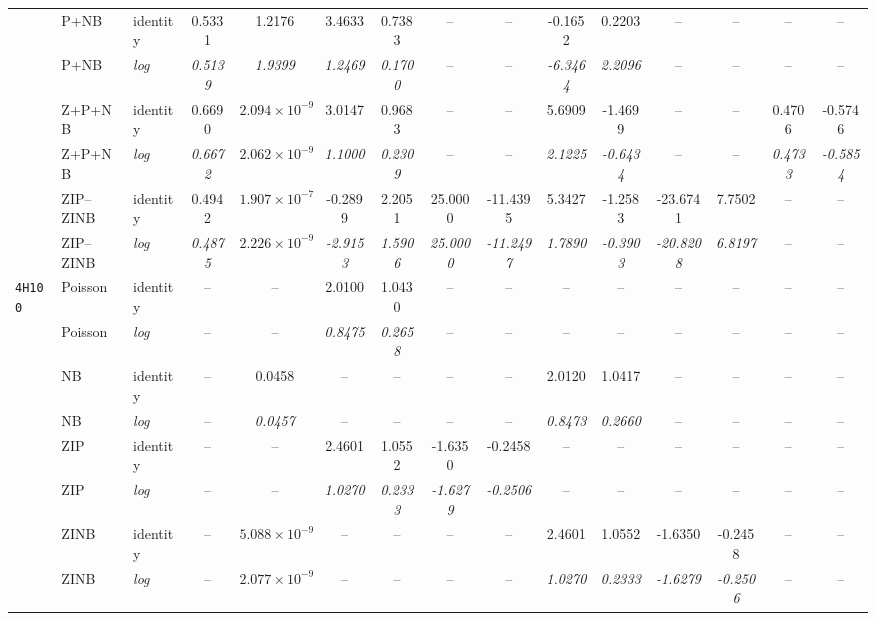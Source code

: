 \begin{table}
{\begin{tabular}{l l l c c c c c c c c c c c c}
 & P+NB & identity & 0.5331 & 1.2176 & 3.4633 & 0.7383 & -- & -- & -0.1652 & 0.2203 & -- & -- & -- & -- \\
 & P+NB & \textit{log} & \textit{0.5139} & \textit{1.9399} & \textit{1.2469} & \textit{0.1700} & -- & -- & \textit{-6.3464} & \textit{2.2096} & -- & -- & -- & -- \\

 & Z+P+NB & identity & 0.6690 & $2.094\times10^{-9}$ & 3.0147 & 0.9683 & -- & -- & 5.6909 & -1.4699 & -- & -- & 0.4706 & -0.5746 \\
 & Z+P+NB & \textit{log} & \textit{0.6672} & $\mathit{2.062\times10^{-9}}$ & \textit{1.1000} & \textit{0.2309} & -- & -- & \textit{2.1225} & \textit{-0.6434} & -- & -- & \textit{0.4733} & \textit{-0.5854} \\

 & ZIP--ZINB & identity & 0.4942 & $1.907\times10^{-7}$ & -0.2899 & 2.2051 & 25.0000 & -11.4395 & 5.3427 & -1.2583 & -23.6741 & 7.7502 & -- & -- \\
 & ZIP--ZINB & \textit{log} & \textit{0.4875} & $\mathit{2.226\times10^{-9}}$ & \textit{-2.9153} & \textit{1.5906} & \textit{25.0000} & \textit{-11.2497} & \textit{1.7890} & \textit{-0.3903} & \textit{-20.8208} & \textit{6.8197} & -- & -- \\

\midrule

\multirow{14}{*}{\texttt{4H100}} & Poisson & identity & -- & -- & 2.0100 & 1.0430 & -- & -- & -- & -- & -- & -- & -- & -- \\
 & Poisson & \textit{log} & -- & -- & \textit{0.8475} & \textit{0.2658} & -- & -- & -- & -- & -- & -- & -- & -- \\

 & NB & identity & -- & 0.0458 & -- & -- & -- & -- & 2.0120 & 1.0417 & -- & -- & -- & -- \\
 & NB & \textit{log} & -- & \textit{0.0457} & -- & -- & -- & -- & \textit{0.8473} & \textit{0.2660} & -- & -- & -- & -- \\

 & ZIP & identity & -- & -- & 2.4601 & 1.0552 & -1.6350 & -0.2458 & -- & -- & -- & -- & -- & -- \\
 & ZIP & \textit{log} & -- & -- & \textit{1.0270} & \textit{0.2333} & \textit{-1.6279} & \textit{-0.2506} & -- & -- & -- & -- & -- & -- \\

 & ZINB & identity & -- & $5.088\times10^{-9}$ & -- & -- & -- & -- & 2.4601 & 1.0552 & -1.6350 & -0.2458 & -- & -- \\
 & ZINB & \textit{log} & -- & $\mathit{2.077\times10^{-9}}$ & -- & -- & -- & -- & \textit{1.0270} & \textit{0.2333} & \textit{-1.6279} & \textit{-0.2506} & -- & -- \\


\end{tabular}}
\end{table}
